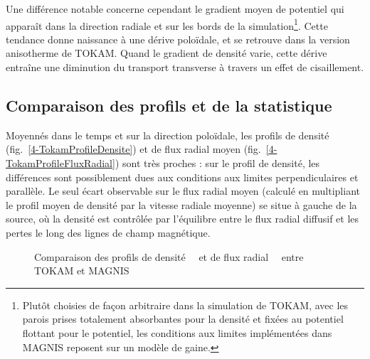 \begin{refsection}
Une différence notable concerne cependant le gradient moyen de potentiel qui
apparaît dans la direction radiale et sur les bords de la simulation\footnote{Plutôt choisies de façon arbitraire dans la simulation de
TOKAM, avec les parois prises totalement absorbantes pour la densité et
fixées au potentiel flottant pour le potentiel, les conditions aux limites
implémentées dans MAGNIS reposent sur un modèle de gaine.}. Cette
tendance donne naissance à
une dérive poloïdale, et se retrouve dans la version anisotherme de TOKAM.
Quand le gradient de densité varie, cette dérive entraîne une diminution du transport transverse à travers un effet de
cisaillement. 

\subsection{Comparaison des profils et de la statistique}

Moyennés dans le temps et sur la direction poloïdale, les profils de densité
(fig.~\ref{4-TokamProfileDensite}) et de flux radial moyen
(fig.~\ref{4-TokamProfileFluxRadial}) sont très proches : sur le profil de
densité, les différences sont possiblement dues aux conditions aux limites
perpendiculaires et parallèle. Le seul écart observable sur le flux radial
moyen (calculé en multipliant le profil moyen de densité par la vitesse
radiale moyenne) se situe à gauche de la source, où la densité est contrôlée par
l'équilibre entre le flux radial diffusif et les pertes le long des lignes de
champ magnétique.

\begin{figure}[!htbp]
  \centering
    \caption{Comparaison des profils de
    densité~~ et de flux
    radial~~ entre TOKAM et MAGNIS}
    \label{4-TokamProfils}
\end{figure}


\end{refsection}
